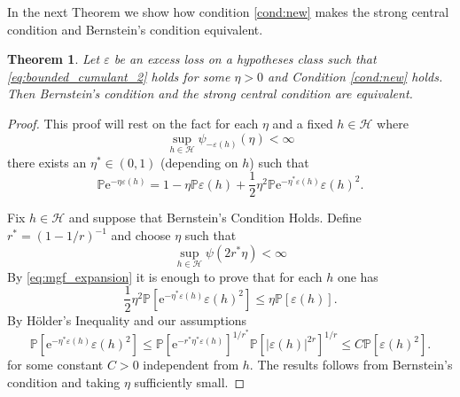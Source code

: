 \documentclass{uvamath}
\newcommand*{\calH}{\mathcal{H}}
\newcommand*{\bbP}{\mathbb{P}}
\newcommand*{\rme}{\mathrm{e}}
\newtheorem{theorem}{Theorem}[section]
\theoremstyle{remark}
\theoremstyle{definition}
\theoremstyle{definition}
\theoremstyle{definition}
\theoremstyle{definition}
\theoremstyle{definition}
\begin{document}
In the next Theorem we show how condition \ref{cond:new} makes the
strong central condition and Bernstein's condition equivalent.

\begin{theorem}\label{thm:bernstein_central_equivalence}
  Let $\varepsilon$ be an excess loss on a hypotheses class such that
  \eqref{eq:bounded_cumulant_2} holds for some $\eta>0$ and Condition
  \ref{cond:new} holds. Then Bernstein's condition and the strong
  central condition are equivalent.
\end{theorem}
\begin{proof}
  This proof will rest on the fact for each $\eta$ and a fixed
  $h\in\calH$
  where $$\sup_{h\in\calH}\psi_{-\varepsilon(h)}(\eta)<\infty$$ there
  exists an $\eta^*\in(0,1)$ (depending on $h$) such that
  \begin{equation}\label{eq:mgf_expansion}
    \bbP\rme^{-\eta \varepsilon(h)} = 1 - \eta\bbP \varepsilon(h) +
    \frac{1}{2}\eta^2\bbP\rme^{-\eta^*\varepsilon(h)}\varepsilon(h)^2.
  \end{equation}

  Fix $h\in\calH$ and suppose that Bernstein's Condition Holds. Define
  $r^* = (1-1/r)^{-1}$ and choose $\eta$ such that
  \begin{equation*}
    \sup_{h\in\calH}\psi(2r^*\eta)<\infty
  \end{equation*}
  By  \eqref{eq:mgf_expansion} it is enough to prove that
  for each $h$ one has
    \begin{equation*}
   \frac{1}{2}\eta^2\bbP[\rme^{-\eta^*\varepsilon(h)}\varepsilon(h)^2] \leq \eta\bbP [\varepsilon(h)].
  \end{equation*}
  By Hölder's Inequality and our assumptions
  \begin{equation*}
    \bbP[\rme^{-\eta^*\varepsilon(h)}\varepsilon(h)^2] \leq
    \bbP[\rme^{-r^*\eta^*\varepsilon(h)}]^{1/r^*}\bbP[|\varepsilon(h)|^{2r}]^{1/r}
    \leq C\bbP[\varepsilon(h)^2].
  \end{equation*}
  for some constant $C>0$ independent from $h$. The results follows
  from Bernstein's condition and taking $\eta$ sufficiently small.


\end{proof}
\end{document}
